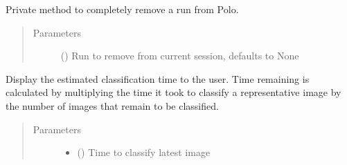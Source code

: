 \documentclass[letterpaper,10pt,english]{sphinxmanual}
\begin{document}
\begin{fulllineitems}
\begin{fulllineitems}
\begin{quote}
\begin{description}
\end{description}\end{quote}

\end{fulllineitems}


\begin{fulllineitems}
\label{\detokenize{polo.widgets:polo.widgets.run_organizer.RunOrganizer._remove_run}}
Private method to completely remove a run from Polo.
\begin{quote}\begin{description}
\item[{Parameters}] \leavevmode
{} ({\hyperref[\detokenize{polo.crystallography:polo.crystallography.run.Run}]{}}\sphinxstyleliteralemphasis{\sphinxupquote{, }}) \textendash{} Run to remove from current session, defaults to None

\end{description}\end{quote}

\end{fulllineitems}


\begin{fulllineitems}
\label{\detokenize{polo.widgets:polo.widgets.run_organizer.RunOrganizer._set_estimated_classification_time}}
Display the estimated classification time to the user. Time remaining
is calculated by multiplying the time it took to classify a representative
image by the number of images that remain to be classified.
\begin{quote}\begin{description}
\item[{Parameters}] \leavevmode\begin{itemize}
\item {} 
 () \textendash{} Time to classify latest image


\end{itemize}
\end{description}
\end{quote}
\end{fulllineitems}
\end{fulllineitems}
\end{document}
